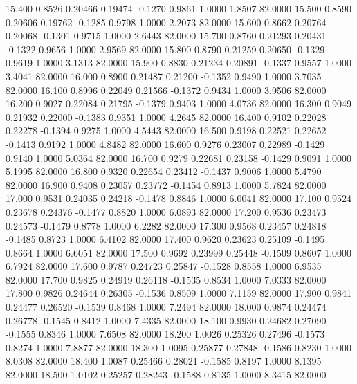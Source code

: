   15.400   0.8526   0.20466   0.19474  -0.1270   0.9861   1.0000   1.8507  82.0000
  15.500   0.8590   0.20606   0.19762  -0.1285   0.9798   1.0000   2.2073  82.0000
  15.600   0.8662   0.20764   0.20068  -0.1301   0.9715   1.0000   2.6443  82.0000
  15.700   0.8760   0.21293   0.20431  -0.1322   0.9656   1.0000   2.9569  82.0000
  15.800   0.8790   0.21259   0.20650  -0.1329   0.9619   1.0000   3.1313  82.0000
  15.900   0.8830   0.21234   0.20891  -0.1337   0.9557   1.0000   3.4041  82.0000
  16.000   0.8900   0.21487   0.21200  -0.1352   0.9490   1.0000   3.7035  82.0000
  16.100   0.8996   0.22049   0.21566  -0.1372   0.9434   1.0000   3.9506  82.0000
  16.200   0.9027   0.22084   0.21795  -0.1379   0.9403   1.0000   4.0736  82.0000
  16.300   0.9049   0.21932   0.22000  -0.1383   0.9351   1.0000   4.2645  82.0000
  16.400   0.9102   0.22028   0.22278  -0.1394   0.9275   1.0000   4.5443  82.0000
  16.500   0.9198   0.22521   0.22652  -0.1413   0.9192   1.0000   4.8482  82.0000
  16.600   0.9276   0.23007   0.22989  -0.1429   0.9140   1.0000   5.0364  82.0000
  16.700   0.9279   0.22681   0.23158  -0.1429   0.9091   1.0000   5.1995  82.0000
  16.800   0.9320   0.22654   0.23412  -0.1437   0.9006   1.0000   5.4790  82.0000
  16.900   0.9408   0.23057   0.23772  -0.1454   0.8913   1.0000   5.7824  82.0000
  17.000   0.9531   0.24035   0.24218  -0.1478   0.8846   1.0000   6.0041  82.0000
  17.100   0.9524   0.23678   0.24376  -0.1477   0.8820   1.0000   6.0893  82.0000
  17.200   0.9536   0.23473   0.24573  -0.1479   0.8778   1.0000   6.2282  82.0000
  17.300   0.9568   0.23457   0.24818  -0.1485   0.8723   1.0000   6.4102  82.0000
  17.400   0.9620   0.23623   0.25109  -0.1495   0.8664   1.0000   6.6051  82.0000
  17.500   0.9692   0.23999   0.25448  -0.1509   0.8607   1.0000   6.7924  82.0000
  17.600   0.9787   0.24723   0.25847  -0.1528   0.8558   1.0000   6.9535  82.0000
  17.700   0.9825   0.24919   0.26118  -0.1535   0.8534   1.0000   7.0333  82.0000
  17.800   0.9826   0.24644   0.26305  -0.1536   0.8509   1.0000   7.1159  82.0000
  17.900   0.9841   0.24477   0.26520  -0.1539   0.8468   1.0000   7.2494  82.0000
  18.000   0.9874   0.24474   0.26778  -0.1545   0.8412   1.0000   7.4335  82.0000
  18.100   0.9930   0.24682   0.27090  -0.1555   0.8346   1.0000   7.6508  82.0000
  18.200   1.0026   0.25326   0.27496  -0.1573   0.8274   1.0000   7.8877  82.0000
  18.300   1.0095   0.25877   0.27848  -0.1586   0.8230   1.0000   8.0308  82.0000
  18.400   1.0087   0.25466   0.28021  -0.1585   0.8197   1.0000   8.1395  82.0000
  18.500   1.0102   0.25257   0.28243  -0.1588   0.8135   1.0000   8.3415  82.0000
